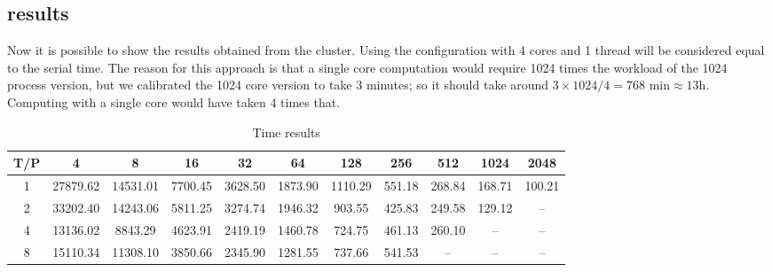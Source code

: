 \documentclass[10pt]{article}
\begin{document}
\begin{multicols}{2}
\subsection*{results}
\label{results}
Now it is possible to show the results obtained from the cluster.
Using the configuration with 4 cores and 1 thread will be considered
equal to the serial time. The reason for this approach is that a single core computation would require 1024 times the workload of the 1024 process version, but we calibrated the 1024 core version to take 3 minutes;
so it should take around $3 \times 1024/4 = 768 \textrm{ min} \approx 13\textrm{h}$. Computing with a single core would have taken 4 times that.
\begin{table}[H]
\centering
\tiny  
\setlength{\tabcolsep}{3pt}
\begin{tabular}{|c|*{10}{c}|}
  \hline
  T/P & 4 & 8 & 16 & 32 & 64 & 128 & 256 & 512 & 1024 & 2048 \\
  \hline
  1 & 27879.62 & 14531.01 & 7700.45 & 3628.50 & 1873.90 & 1110.29 & 551.18 & 268.84 & 168.71 & 100.21 \\
  2 & 33202.40 & 14243.06 & 5811.25 & 3274.74 & 1946.32 & 903.55 & 425.83 & 249.58 & 129.12 & -- \\
  4 & 13136.02 & 8843.29 & 4623.91 & 2419.19 & 1460.78 & 724.75 & 461.13 & 260.10 & -- & -- \\
  8 & 15110.34 & 11308.10 & 3850.66 & 2345.90 & 1281.55 & 737.66 & 541.53 & -- & -- & -- \\
  \hline
\end{tabular}
\caption{Time results}
\label{time_results}
\end{table}


\end{multicols}
\end{document}
